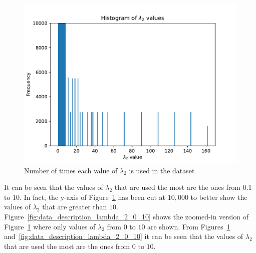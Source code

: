 \begin{figure}[H]
    \centering
    \includegraphics[width=\linewidth]{chapters/05_numerical_results/Bin/descriptive/lambda_2_histogram.pdf}
    \caption{Number of times each value of \(\lambda_2\) is used in the dataset}
    \label{fig:data_description_lambda_2}
\end{figure}

It can be seen that the values of \(\lambda_2\) that are used the most are
the ones from \(0.1\) to \(10\).
In fact, the y-axis of Figure~\ref{fig:data_description_lambda_2} has been cut
at \(10,\!000\) to better show the values of \(\lambda_2\) that are greater than
\(10\).
Figure~\ref{fig:data_description_lambda_2_0_10} shows the zoomed-in version of
Figure~\ref{fig:data_description_lambda_2} where only values of \(\lambda_2\)
from \(0\) to \(10\) are shown.
From Figures~\ref{fig:data_description_lambda_2}
and~\ref{fig:data_description_lambda_2_0_10} it can be seen that the values of
\(\lambda_2\) that are used the most are the ones from \(0\) to \(10\).

